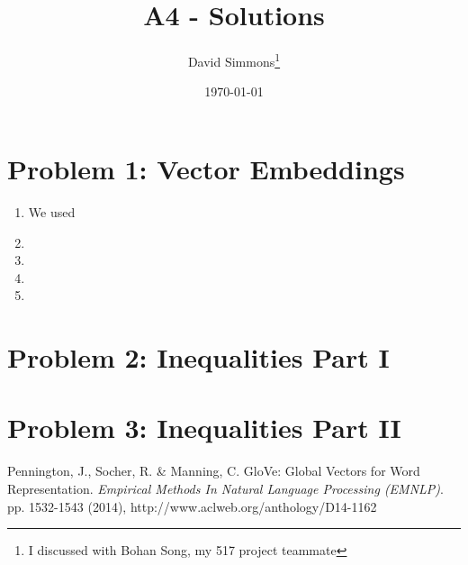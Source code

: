 \documentclass{article}
\newcommand{\1}{\textbf{1}}
\begin{document}
\title{{A4} - Solutions}
\author{David Simmons\footnote{I discussed with Bohan Song, my 517 project teammate}}
\date{\today}

\maketitle


\section{Problem 1: Vector Embeddings}
\begin{enumerate}
\item We used \cite{pennington2014glove}

\item

\item

\item

\item

\end{enumerate}


\newpage

\section{Problem 2: Inequalities Part I}


\newpage

\section{Problem 3: Inequalities Part II}

\newpage

\begin{thebibliography}{99}
Pennington, J., Socher, R. \& Manning, C. GloVe: Global Vectors for Word Representation. {\em Empirical Methods In Natural Language Processing (EMNLP)}. pp. 1532-1543 (2014), http://www.aclweb.org/anthology/D14-1162
\end{thebibliography}
\end{document}
